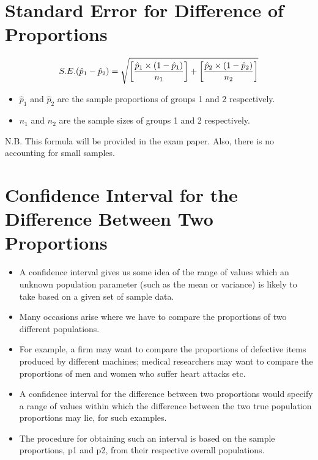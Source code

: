 \documentclass[]{report}
\begin{document}
\section{Standard Error for Difference of Proportions}

\[ S.E. (\hat{p}_1 - \hat{p}_2) =
\sqrt{ \left[{\hat{p}_1 \times (1 - \hat{p}_1) \over n_1}\right] + \left[{\hat{p}_2 \times (1 - \hat{p}_2) \over n_2}\right] } \]
\begin{itemize}
\item $\hat{p}_1$ and $\hat{p}_2$ are the sample proportions of groups 1 and 2 respectively.
\item $n_1$ and $n_2$ are the sample sizes of groups 1 and 2 respectively.
\end{itemize}
N.B. This formula will be provided in the exam paper. Also, there is no accounting for small samples.




\section*{Confidence Interval for the Difference Between Two Proportions}
\begin{itemize}
\item A confidence interval gives us some idea of the range of values which an unknown population parameter (such as the mean or variance) is likely to take based on a given set of sample data.

\item Many occasions arise where we have to compare the proportions of two different populations. 
\item For example, a firm may want to compare the proportions of defective items produced by different machines; medical researchers may want to compare the proportions of men and women who suffer heart attacks etc. 
\item A confidence interval for the difference between two proportions would specify a range of values within which the difference between the two true population proportions may lie, for such examples.

\item The procedure for obtaining such an interval is based on the sample proportions, p1 and p2, from their respective overall populations.
\end{itemize}



\end{document}
